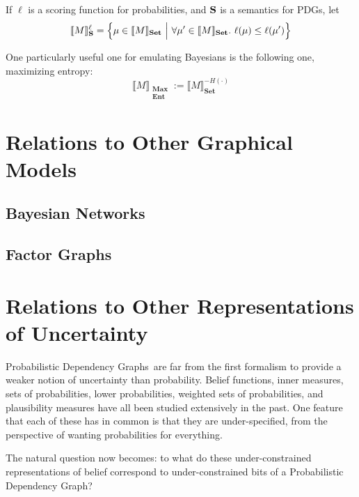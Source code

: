 \documentclass{article}
\newcommand{\modelname}{Probabilistic Dependency Graph}
\newcommand{\modelnames}{Probabilistic Dependency Graphs}
\newcommand{\MNs}{PDGs}
\newcommand\Set{\textbf{Set}}
\newcommand\MaxEnt{{\substack{\mathbf{Max}\\\mathbf{Ent}}}}
\begin{document}
	
	\begin{defn}
		If $\ell$ is a scoring function for probabilities, and $\bf S$ is a semantics for \MNs, let 
		\begin{align*}
			\llbracket M \rrbracket_{\bf S}^\ell &=  \left\{\mu \in \llbracket M \rrbracket_\Set ~\Big|~ \forall \mu' \in \llbracket M \rrbracket_\Set.~ \ell(\mu) \leq \ell(\mu')  \right\} \\
		\end{align*}
	\end{defn}
	
	One particularly useful one for emulating Bayesians is the following one, maximizing entropy:
	\[ \Big\llbracket M \Big\rrbracket_\MaxEnt := \Big\llbracket M \Big\rrbracket_\Set^{-H(\cdot)} \]

%	
	
	\section{Relations to Other Graphical Models}
	\subsection{Bayesian Networks}
	\subsection{Factor Graphs}

	\section{Relations to Other Representations of Uncertainty}
	\modelnames\ are far from the first formalism to provide a weaker notion of uncertainty than probability. Belief functions, inner measures, sets of probabilities, lower probabilities, weighted sets of probabilities, and plausibility measures have all been studied extensively in the past. One feature that each of these has in common is that they are under-specified, from the perspective of wanting probabilities for everything.

	The natural question now becomes: to what do these under-constrained representations of belief correspond to under-constrained bits of a \modelname?
\end{document}
